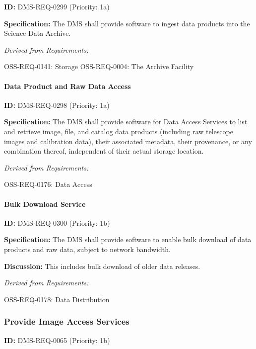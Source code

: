 \documentclass[SE,toc,lsstdraft]{lsstdoc}
\begin{document}
\label{DMS-REQ-0299}
\textbf{ID:} DMS-REQ-0299 (Priority: 1a)

\textbf{Specification:} The DMS shall provide software to ingest data products into the Science Data Archive.

\emph{Derived from Requirements:}

OSS-REQ-0141:
Storage \newline
OSS-REQ-0004:
The Archive Facility \newline

\paragraph{Data Product and Raw Data Access}\hfill  %

\label{DMS-REQ-0298}
\textbf{ID:} DMS-REQ-0298 (Priority: 1a)

\textbf{Specification:} The DMS shall provide software for Data Access Services to list and retrieve image, file, and catalog data products (including raw telescope images and calibration data), their associated metadata, their provenance, or any combination thereof, independent of their actual storage location.

\emph{Derived from Requirements:}

OSS-REQ-0176:
Data Access \newline

\paragraph{Bulk Download Service}\hfill  %

\label{DMS-REQ-0300}
\textbf{ID:} DMS-REQ-0300 (Priority: 1b)

\textbf{Specification:} The DMS shall provide software to enable bulk download of data products and raw data, subject to network bandwidth.

\textbf{Discussion:} This includes bulk download of older data releases.

\emph{Derived from Requirements:}

OSS-REQ-0178:
Data Distribution \newline

\subsubsection{Provide Image Access Services}

\label{DMS-REQ-0065}
\textbf{ID:} DMS-REQ-0065 (Priority: 1b)
\end{document}
